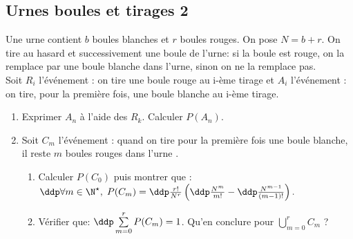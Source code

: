 

\subsection{Urnes boules et tirages 2 }

\begin{exercice}   \;
Une urne contient $b$ boules blanches et $r$ boules rouges. On pose $N=b+r$. On tire au hasard et successivement une boule de l'urne: si la boule est rouge, on la remplace par une boule blanche dans l'urne, sinon on ne la remplace pas.\\
\noindent Soit $R_i$ l'\'ev\'enement : \og on tire une boule rouge au i-\`eme tirage\fg \;  et $A_i$ l'\'ev\'enement : \og on tire, pour la premi\`ere fois, une boule blanche au i-\`eme tirage\fg.
\begin{enumerate}
 \item Exprimer $A_n$ \`a l'aide des $R_k$. Calculer $P(A_n)$.
\item Soit $C_m$ l'\'ev\'enement : \og quand on tire pour la premi\`ere fois une boule blanche, il reste $m$ boules rouges dans l'urne \fg.
\begin{enumerate}
\item Calculer $P(C_0)$ puis montrer que : $\ddp \forall m\in\N^{\star},\; P(C_m)=\ddp\frac{r!}{N^r}\left( \ddp\frac{N^m}{m!}-\ddp\frac{N^{m-1}}{(m-1)!} \right).$
\item V\'erifier que: $\ddp \sum\limits_{m=0}^r P(C_m)=1$. Qu'en conclure pour $\bigcup\limits_{m=0}^r C_m$ ?
\end{enumerate}
\end{enumerate}
\end{exercice}


